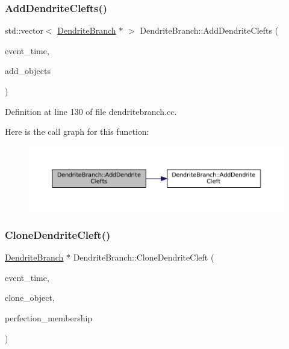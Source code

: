 \subsubsection{\texorpdfstring{Add\+Dendrite\+Clefts()}{AddDendriteClefts()}}
{\footnotesize\ttfamily std\+::vector$<$ \mbox{\hyperlink{class_dendrite_branch}{Dendrite\+Branch}} $\ast$ $>$ Dendrite\+Branch\+::\+Add\+Dendrite\+Clefts (\begin{DoxyParamCaption}\item[{std\+::chrono\+::time\+\_\+point$<$ \mbox{\hyperlink{universe_8h_a0ef8d951d1ca5ab3cfaf7ab4c7a6fd80}{Clock}} $>$}]{event\+\_\+time,  }\item[{std\+::vector$<$ \mbox{\hyperlink{class_dendrite_branch}{Dendrite\+Branch}} $\ast$$>$}]{add\+\_\+objects }\end{DoxyParamCaption})}



Definition at line 130 of file dendritebranch.\+cc.

Here is the call graph for this function\+:\nopagebreak
\begin{figure}[H]
\begin{center}
\leavevmode
\includegraphics[width=350pt]{class_dendrite_branch_a2ddeff41db805e414c994ac169cbcf4b_cgraph}
\end{center}
\end{figure}
\mbox{\label{class_dendrite_branch_a45d2fea350165fe0c81f1f429aa96061}} 
\subsubsection{\texorpdfstring{Clone\+Dendrite\+Cleft()}{CloneDendriteCleft()}}
{\footnotesize\ttfamily \mbox{\hyperlink{class_dendrite_branch}{Dendrite\+Branch}} $\ast$ Dendrite\+Branch\+::\+Clone\+Dendrite\+Cleft (\begin{DoxyParamCaption}\item[{std\+::chrono\+::time\+\_\+point$<$ \mbox{\hyperlink{universe_8h_a0ef8d951d1ca5ab3cfaf7ab4c7a6fd80}{Clock}} $>$}]{event\+\_\+time,  }\item[{\mbox{\hyperlink{class_dendrite_branch}{Dendrite\+Branch}} $\ast$}]{clone\+\_\+object,  }\item[{double}]{perfection\+\_\+membership }\end{DoxyParamCaption})}



